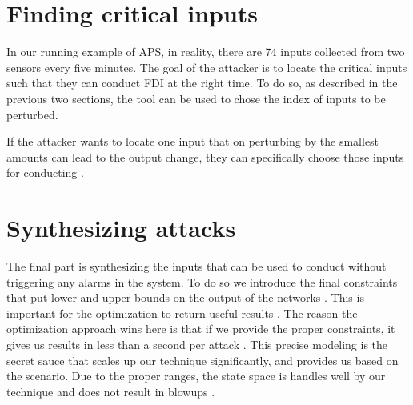 \section{Finding critical inputs}
In our running example of APS, in reality, there are 74 inputs collected from two sensors every five minutes. The goal of the attacker is to locate the critical inputs such that they can conduct FDI at the right time. To do so, as described in the previous two sections, the tool can be used to chose the index of inputs to be perturbed. 

If the attacker wants to locate one input that on perturbing by the smallest amounts can lead to the output change, they can specifically choose those inputs for conducting \attack.


\label{section:cost function}
\section{Synthesizing attacks}
The final part is synthesizing the inputs that can be used to conduct \attack without triggering any alarms in the system. To do so we introduce the final constraints that put lower and upper bounds on the output of the networks . This is important for the optimization to return useful results . The reason the optimization approach wins here is that if we provide the proper constraints, it gives us results in less than a second per attack . This precise modeling is the secret sauce  that scales up our technique significantly, and provides us  \attack based on the scenario. Due to the proper ranges, the state space is handles well by our technique  and does not result in blowups .


